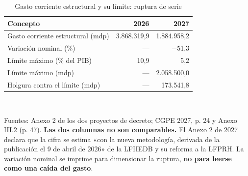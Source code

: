 \begin{table}[htbp]\centering\small
\caption{Gasto corriente estructural y su límite: ruptura de serie}\label{cua:gce}
\begin{tabular}{lrr}
\toprule
Concepto & 2026 & 2027 \\
\midrule
Gasto corriente estructural (mdp) & 3.868.319,9 & 1.884.958,2 \\
Variación nominal (\%) & --- & $-$51,3 \\
Límite máximo (\% del PIB) & 10,9 & 5,2 \\
Límite máximo (mdp) & --- & 2.058.500,0 \\
Holgura contra el límite (mdp) & --- & 173.541,8 \\
\bottomrule
\end{tabular}
\\[2pt]\begin{minipage}{0.92\textwidth}\scriptsize Fuentes: Anexo 2 de los dos proyectos de decreto; CGPE 2027, p. 24 y Anexo III.2 (p. 47). \textbf{Las dos columnas no son comparables.} El Anexo 2 de 2027 declara que la cifra se estima «con la nueva metodología, derivada de la publicación el 9 de abril de 2026» de la LFIIEDB y su reforma a la LFPRH. La variación nominal se imprime para dimensionar la ruptura, \textbf{no para leerse como una caída del gasto}.\end{minipage}
\end{table}

